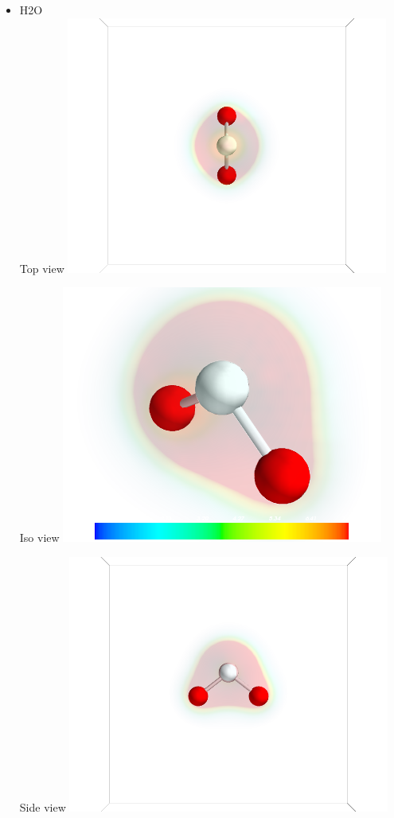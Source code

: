 \documentclass[11pt]{article}
\begin{document}
\begin{itemize}

\item H2O\\
\label{sec-1-6-1-1}%
Top view
\includegraphics[width=.9\linewidth]{./images/h2o_top.png}

Iso view
\includegraphics[width=.9\linewidth]{./images/h2o_iso.png}

Side view
\includegraphics[width=.9\linewidth]{./images/h2o_side.png}


\end{itemize}
\end{document}
